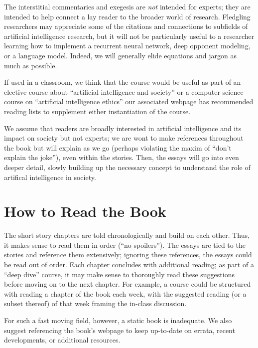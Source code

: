 The interstitial commentaries and exegesis are \emph{not} intended for experts; they are intended to help connect a lay reader to the broader world of research.  Fledgling researchers may appreciate some of the citations and connections to subfields of artificial intelligence research, but it will not be particularly useful to a researcher learning how to implement a recurrent neural network, deep opponent modeling, or a language model.  Indeed, we will generally elide equations and jargon as much as possible.

If used in a classroom, we think that the course would be useful as part of an elective course about ``artificial intelligence and society'' or a computer science course on ``artificial intelligence ethics'' our associated webpage has recommended reading lists to supplement either instantiation of the course.

We assume that readers are broadly interested in artificial intelligence and its impact on society but not experts; we are wont to make references throughout the book but will explain as we go (perhaps violating the maxim of ``don't explain the joke''), even within the stories.  Then, the essays will go into even deeper detail, slowly building up the necessary concept to understand the role of artifical intelligence in society.

\section{How to Read the Book}

The short story chapters are told chronologically and build on each other.  Thus, it makes sense to read them in order (``no spoilers'').  The essays are tied to the stories and reference them extensively; ignoring these references, the essays could be read out of order.  Each chapter concludes with additional reading; as part of a ``deep dive'' course, it may make sense to thoroughly read these suggestions before moving on to the next chapter.  For example, a course could be structured with reading a chapter of the book each week, with the suggested reading (or a subset thereof) of that week framing the in-class discussion.

For such a fast moving field, however, a static book is inadequate.  We also suggest referencing the book's webpage to keep up-to-date on errata, recent developments, or additional resources.